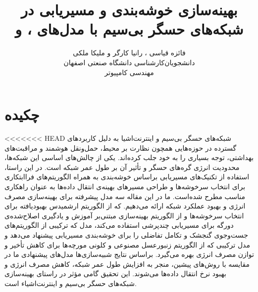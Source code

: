 \documentclass[11.5pt,onecolumn,a4paper]{article}
\begin{document}
	
	\title{بهینه‌سازی خوشه‌بندی و مسیر‌یابی در شبکه‌های حسگر بی‌سیم با مدل‌های ،  و } 
	\author{فائزه قیاسی ، رانیا کارگر و ملیکا ملکی\\
		دانشجویان‌کارشناسی دانشگاه صنعتی اصفهان\\
		مهندسی کامپیوتر}
	\date{}
	\maketitle
	\thispagestyle{empty}
	\vfill
	\section*{چکیده}
<<<<<<< HEAD
	شبکه‌های حسگر بی‌سیم و اینترنت‌اشیا به دلیل کاربردهای گسترده در حوزه‌هایی همچون نظارت بر محیط، حمل‌ونقل هوشمند و مراقبت‌های بهداشتی، توجه بسیاری را به خود جلب کرده‌اند. یکی از چالش‌های اساسی این شبکه‌ها، محدودیت انرژی گره‌های حسگر و تأثیر آن بر طول عمر شبکه است. در این راستا، استفاده از تکنیک‌های مسیریابی براساس خوشه‌بندی به‌ همراه الگوریتم‌های فراابتکاری برای انتخاب سرخوشه‌ها و طراحی مسیرهای بهینه‌ی انتقال داده‌ها به عنوان راهکاری مناسب مطرح شده‌است. ما در این مقاله سه مدل پیشرفته برای بهینه‌سازی مصرف انرژی و بهبود عملکرد شبکه ارائه می‌دهیم.  که از الگوریتم ارشمیدس بهبودیافته برای انتخاب سرخوشه‌ها و از الگوریتم بهینه‌سازی مبتنی‌بر آموزش و یادگیری اصلاح‌شده‌ی دورگه برای مسیریابی چندپرشی استفاده می‌کند، مدل  که ترکیبی از الگوریتم‌های جست‌وجوی گنجشک و تکامل تفاضلی را برای خوشه‌بندی مسیریابی پیشنهاد می‌دهد و مدل ترکیبی  که از الگوریتم زنبورعسل مصنوعی و کلونی مورچه‌ها برای کاهش تأخیر و توازن مصرف انرژی بهره می‌گیرد. براساس نتایج شبیه‌سازی‌ها مدل‌های پیشنهادی ما در مقایسه با روش‌های پیشین، منجر به افزایش طول عمر شبکه، کاهش مصرف انرژی و بهبود نرخ انتقال داده‌ها می‌شوند. این تحقیق گامی مؤثر در راستای بهینه‌سازی شبکه‌های حسگر بی‌سیم و اینترنت‌اشیاء است.
	
	\clearpage
	\newpage
\end{document}
